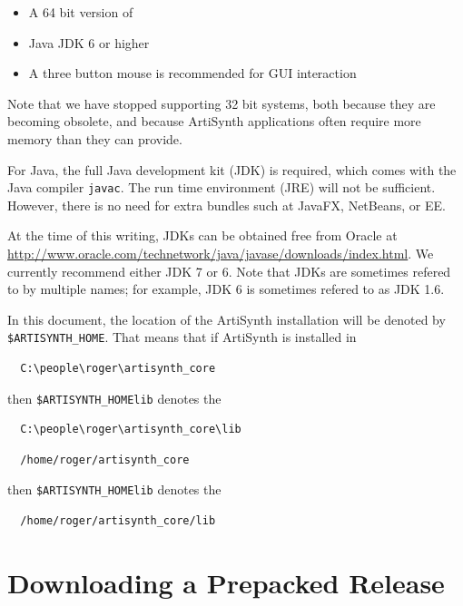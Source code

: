 \begin{itemize}

\item A 64 bit version of \SYSTEM

\item Java JDK 6 or higher

\item A three button mouse is recommended for GUI interaction

\end{itemize}

Note that we have stopped supporting 32 bit systems, both because they
are becoming obsolete, and because ArtiSynth applications often
require more memory than they can provide.

For Java, the full Java development kit (JDK) is required, which comes
with the Java compiler {\tt javac}. The run time environment (JRE)
will not be sufficient. However, there is no need for extra bundles
such at JavaFX, NetBeans, or EE.

At the time of this writing, JDKs can be obtained free from Oracle at
\href{http://www.oracle.com/technetwork/java/javase/downloads/index.html}
{http://www.oracle.com/technetwork/java/javase/downloads/index.html}.
We currently recommend either JDK 7 or 6. Note that JDKs are sometimes
refered to by multiple names; for example, JDK 6 is sometimes refered
to as JDK 1.6.

In this document, the location of the ArtiSynth installation \directory
will be denoted by {\tt \$ARTISYNTH\_HOME}.  That
means that if ArtiSynth is installed in
\ifWindows
\begin{verbatim}
  C:\people\roger\artisynth_core
\end{verbatim}
then {\tt \$ARTISYNTH\_HOME\SEP lib} denotes the \directory
\begin{verbatim}
  C:\people\roger\artisynth_core\lib
\end{verbatim}
\else
\begin{verbatim}
  /home/roger/artisynth_core
\end{verbatim}
then {\tt \$ARTISYNTH\_HOME\SEP lib} denotes the \directory
\begin{verbatim}
  /home/roger/artisynth_core/lib
\end{verbatim}
\fi

\section{Downloading a Prepacked Release}
\label{PrepackagedRelease}

